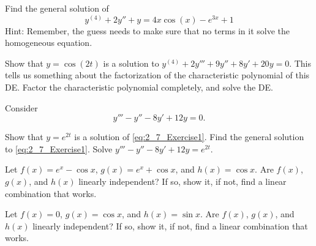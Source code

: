 \documentclass{ximera}
\begin{document}
\begin{exercise}
    Find the general solution of 
    \begin{equation*}
        y^{(4)}  + 2y'' + y = 4x\cos(x) - e^{3x} + 1
    \end{equation*}
    Hint: Remember, the guess needs to make sure that no terms in it solve the homogeneous equation.
\end{exercise}


\begin{exercise}
    Show that $y=\cos(2t)$ is a solution to $y^{(4)}+2y'''+9y''+8y'+20y=0$. %
    This tells us something about the factorization of the characteristic polynomial of this DE. Factor the characteristic polynomial completely, and solve the DE.
\end{exercise}

\begin{exercise}
    Consider 
    \begin{equation}
        y'''-y''-8y'+12y=0. \label{eq:2_7_Exercise1}
    \end{equation}
    \begin{tasks}
        \task Show that $y=e^{2t}$ is a solution of \eqref{eq:2_7_Exercise1}.
        \task Find the general solution to \eqref{eq:2_7_Exercise1}.
        \task Solve $y'''-y''-8y'+12y=e^{2t}$.
    \end{tasks}
\end{exercise}

\begin{exercise}
    Let $f(x) = e^x - \cos x$, $g(x) = e^x + \cos x$, and $h(x) = \cos x$. Are $f(x)$, $g(x)$, and $h(x)$ linearly independent?  If so, show it, if not, find a linear combination that works.
\end{exercise}

\begin{exercise}
    Let $f(x) = 0$, $g(x) = \cos x$, and $h(x) = \sin x$. Are $f(x)$, $g(x)$, and $h(x)$ linearly independent?  If so, show it, if not, find a linear combination that works. 
\end{exercise}
\end{document}
